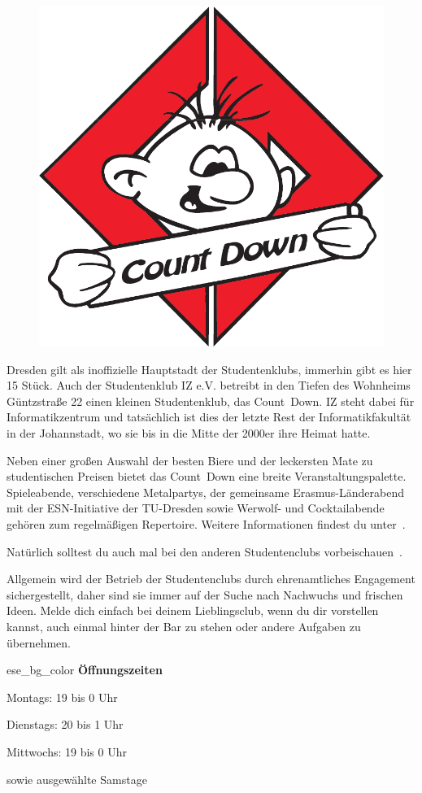 \begin{figure}%
  \vspace{-.5cm}
  \includegraphics[width=\linewidth]{img/countdown}
  \vspace{-1cm}
\end{figure}

Dresden gilt als inoffizielle Hauptstadt der Studentenklubs, immerhin gibt es hier 15 Stück.
Auch der Studentenklub IZ e.V. betreibt in den Tiefen des Wohnheims Güntzstraße 22 einen kleinen Studentenklub, das Count~Down.
IZ steht dabei für Informatikzentrum und tatsächlich ist dies der letzte Rest der Informatikfakultät in der Johannstadt, wo sie bis in die Mitte der 2000er ihre Heimat hatte.

Neben einer großen Auswahl der besten Biere und der leckersten Mate zu studentischen Preisen bietet das Count~Down eine breite Veranstaltungspalette. Spieleabende, verschiedene Metalpartys, der gemeinsame Erasmus-Länderabend mit der ESN-Initiative der TU-Dresden sowie Werwolf- und Cocktailabende gehören zum regelmäßigen Repertoire.
Weitere Informationen findest du unter~.

Natürlich solltest du auch mal bei den anderen Studentenclubs vorbeischauen~.

Allgemein wird der Betrieb der Studentenclubs durch ehrenamtliches Engagement sichergestellt, daher sind sie immer auf der Suche nach Nachwuchs und frischen Ideen. Melde dich einfach bei deinem Lieblingsclub, wenn du dir vorstellen kannst, auch einmal hinter der Bar zu stehen oder andere Aufgaben zu übernehmen.

\begin{awesomeblock}{2pt}{\faCalendar*[regular]}{ese_bg_color}
    \textbf{Öffnungszeiten}

    Montags: 19 bis 0 Uhr

    Dienstags: 20 bis 1 Uhr

    Mittwochs: 19 bis 0 Uhr

    sowie ausgewählte Samstage
\end{awesomeblock}
